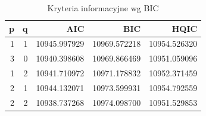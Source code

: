 \documentclass{article}
\theoremstyle{break}
\begin{document}
	\begin{table}[H]
		\centering
		\begin{tabular}{|r|r|r|r|r|}
			\hline
			\rowcolor[HTML]{C0C0C0} 
			{\color[HTML]{111111} \textbf{p}} & {\color[HTML]{111111} \textbf{q}} & {\color[HTML]{111111} \textbf{AIC}} & {\color[HTML]{111111} \textbf{BIC}} & {\color[HTML]{111111} \textbf{HQIC}} \\ \hline
			\rowcolor[HTML]{FFFFFF} 
			{\color[HTML]{111111} 1}          & {\color[HTML]{111111} 1}          & {\color[HTML]{111111} 10945.997929} & {\color[HTML]{111111} 10969.572218} & {\color[HTML]{111111} 10954.526320}  \\ \hline
			\rowcolor[HTML]{FFFFFF} 
			{\color[HTML]{111111} 3}          & {\color[HTML]{111111} 0}          & {\color[HTML]{111111} 10940.398608} & {\color[HTML]{111111} 10969.866469} & {\color[HTML]{111111} 10951.059096}  \\ \hline
			\rowcolor[HTML]{FFFFFF} 
			{\color[HTML]{111111} 1}          & {\color[HTML]{111111} 2}          & {\color[HTML]{111111} 10941.710972} & {\color[HTML]{111111} 10971.178832} & {\color[HTML]{111111} 10952.371459}  \\ \hline
			\rowcolor[HTML]{FFFFFF} 
			{\color[HTML]{111111} 2}          & {\color[HTML]{111111} 1}          & {\color[HTML]{111111} 10944.132071} & {\color[HTML]{111111} 10973.599931} & {\color[HTML]{111111} 10954.792559}  \\ \hline
			\rowcolor[HTML]{FFFFFF} 
			{\color[HTML]{111111} 2}          & {\color[HTML]{111111} 2}          & {\color[HTML]{111111} 10938.737268} & {\color[HTML]{111111} 10974.098700} & {\color[HTML]{111111} 10951.529853}  \\ \hline
		\end{tabular}
		\caption{Kryteria informacyjne wg BIC}
		\label{t2}
	\end{table}
	
\end{document}
